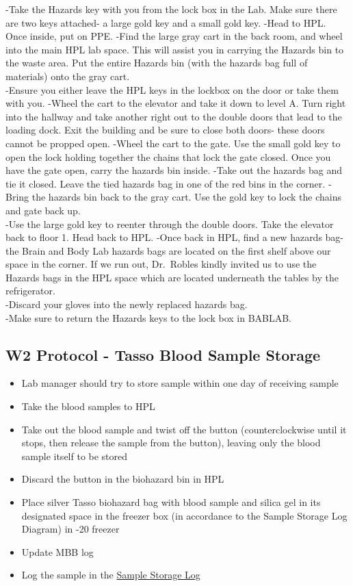 \documentclass[]{book}
\providecommand{\tightlist}{%
  \setlength{\itemsep}{0pt}\setlength{\parskip}{0pt}}
\begin{document}
-Take the Hazards key with you from the lock box in the Lab. Make sure there are two keys attached- a large gold key and a small gold key.
-Head to HPL. Once inside, put on PPE.
-Find the large gray cart in the back room, and wheel into the main HPL lab space. This will assist you in carrying the Hazards bin to the waste area. Put the entire Hazards bin (with the hazards bag full of materials) onto the gray cart.\\
-Ensure you either leave the HPL keys in the lockbox on the door or take them with you.
-Wheel the cart to the elevator and take it down to level A. Turn right into the hallway and take another right out to the double doors that lead to the loading dock. Exit the building and be sure to close both doors- these doors cannot be propped open.
-Wheel the cart to the gate. Use the small gold key to open the lock holding together the chains that lock the gate closed. Once you have the gate open, carry the hazards bin inside.
-Take out the hazards bag and tie it closed. Leave the tied hazards bag in one of the red bins in the corner.
-Bring the hazards bin back to the gray cart. Use the gold key to lock the chains and gate back up.\\
-Use the large gold key to reenter through the double doors. Take the elevator back to floor 1. Head back to HPL.
-Once back in HPL, find a new hazards bag- the Brain and Body Lab hazards bags are located on the first shelf above our space in the corner. If we run out, Dr.~Robles kindly invited us to use the Hazards bags in the HPL space which are located underneath the tables by the refrigerator.\\
-Discard your gloves into the newly replaced hazards bag.\\
-Make sure to return the Hazards keys to the lock box in BABLAB.

\hypertarget{w2-protocol---tasso-blood-sample-storage}{%
\subsection{W2 Protocol - Tasso Blood Sample Storage}\label{w2-protocol---tasso-blood-sample-storage}}

\begin{itemize}
\tightlist
\item
  Lab manager should try to store sample within one day of receiving sample
\item
  Take the blood samples to HPL
\item
  Take out the blood sample and twist off the button (counterclockwise until it stops, then release the sample from the button), leaving only the blood sample itself to be stored
\item
  Discard the button in the biohazard bin in HPL
\item
  Place silver Tasso biohazard bag with blood sample and silica gel in its designated space in the freezer box (in accordance to the Sample Storage Log Diagram) in -20 freezer
\item
  Update MBB log
\item
  Log the sample in the \href{https://app.box.com/file/630322897864}{Sample Storage Log}
\end{itemize}
\end{document}
